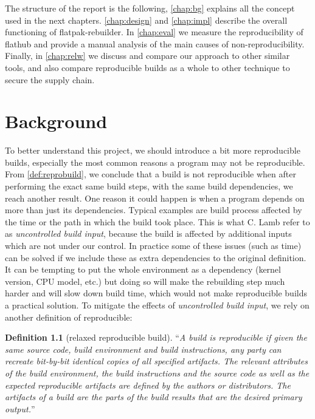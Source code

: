 \documentclass[a4paper,11pt,oneside]{report}
\theoremstyle{definition}
\newtheorem{definition}{Definition}[section]
\newcommand{\sysname}{flatpak-rebuilder\xspace}
\newcommand{\rb}{reproducible builds\xspace}
\newcommand{\fh}{flathub\xspace}
\begin{document}
The structure of the report is the following, \autoref{chap:bg} explains all
the concept used in the next chapters. \autoref{chap:design} and
\autoref{chap:impl} describe the overall functioning of \sysname. In
\autoref{chap:eval} we measure the reproducibility of \fh and provide a manual
analysis of the main causes of non-reproducibility. Finally, in
\autoref{chap:relw} we discuss and compare our approach to other similar tools,
and also compare \rb as a whole to other technique to secure the supply chain.

\chapter{Background}
\label{chap:bg}

To better understand this project, we should introduce a bit more \rb,
especially the most common reasons a program may not be reproducible. From
\autoref{def:reprobuild}, we conclude that a build is not reproducible when
after performing the exact same build steps, with the same build dependencies,
we reach another result. One reason it could happen is when a program
depends on more than just its dependencies. Typical examples are build process
affected by the time or the path in which the build took place. This is what C.
Lamb refer to as \emph{uncontrolled build input}, because the build is
affected by additional inputs which are not under our control.
In practice some of these issues (such as time) can be solved if we
include these as extra dependencies to the original definition. It can be tempting
to put the whole environment as a dependency (kernel version, CPU model, etc.) but
doing so will make the rebuilding step much harder and will slow down build time,
which would not make \rb a practical solution.
To mitigate the effects of \emph{uncontrolled build input}, we rely on another
definition of reproducible:
\begin{definition}[relaxed reproducible build]
\label{def:reprobuild2}
``\emph{A build is reproducible if given the same source code, build
    environment and build instructions, any party can recreate bit-by-bit
    identical copies of all specified artifacts.
The relevant attributes of the build environment, the build instructions and
    the source code as well as the expected reproducible artifacts are defined
    by the authors or distributors. The artifacts of a build are the parts of
    the build results that are the desired primary output.}''~\cite{reprobuilds:def}
\end{definition}
\end{document}
